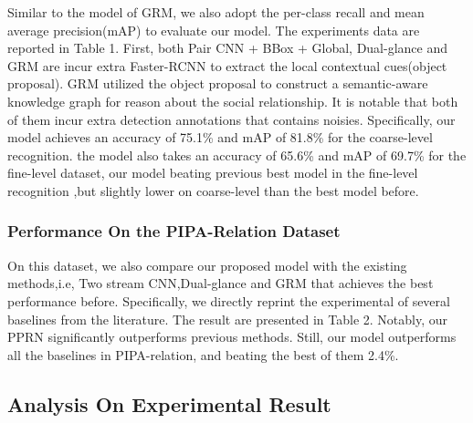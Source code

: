 \documentclass{article}
\newcommand{\PPRN}{{\sf PPRN}}
\begin{document}
Similar to the model of GRM, we also adopt the per-class recall and mean average precision(mAP) to evaluate our model. The experiments data are reported in Table 1. First, both Pair CNN + BBox + Global, Dual-glance and GRM are incur extra Faster-RCNN\cite{DBLP:conf/nips/RenHGS15} to extract the local contextual cues(object proposal). GRM utilized the object proposal to construct a semantic-aware  knowledge graph for reason about the social relationship. It is notable that both of them incur extra detection annotations that contains noisies. Specifically, our model achieves an accuracy of 75.1\% and mAP of 81.8\% for the coarse-level recognition. the model also takes an accuracy of 65.6\% and mAP of 69.7\% for the fine-level dataset, our model beating previous best model in the fine-level recognition ,but slightly lower on coarse-level than the best model before.

\subsubsection{Performance On the PIPA-Relation Dataset}

On this dataset, we also compare our proposed model with the existing methods,i.e, Two stream CNN\cite{DBLP:conf/cvpr/SunSF17},Dual-glance\cite{DBLP:conf/iccv/LiWZK17} and GRM\cite{DBLP:conf/ijcai/WangCRYCL18} that achieves the best performance before. Specifically, we directly reprint the experimental of several baselines from the literature. The result are presented in Table 2. Notably, our {\PPRN} significantly outperforms previous methods. Still, our model outperforms all the baselines in PIPA-relation, and beating the best of them 2.4\%.

\subsection{Analysis On Experimental Result}
\end{document}
